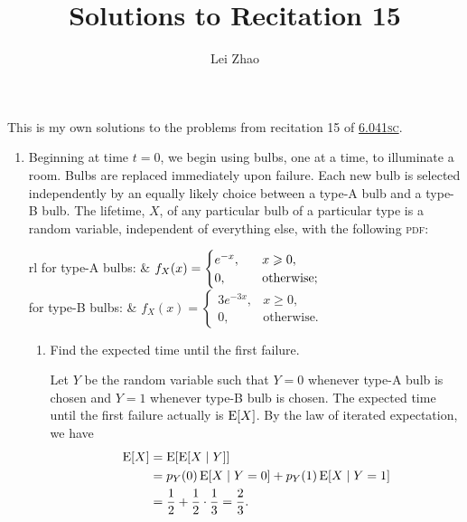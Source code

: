

\title{Solutions to Recitation 15}
\author{Lei Zhao}



\maketitle

This is my own solutions to the problems from recitation 15 of
\href{https://ocw.mit.edu/courses/electrical-engineering-and-computer-science/6-041sc-probabilistic-systems-analysis-and-applied-probability-fall-2013/unit-iii/lecture-13/}{6.041\textsc{sc}}.

\begin{enumerate}
\item Beginning at time \(t = 0\), we begin using bulbs, one at a
  time, to illuminate a room.  Bulbs are replaced immediately upon
  failure.  Each new bulb is selected independently by an equally
  likely choice between a type-A bulb and a type-B bulb.  The
  lifetime, \(X\), of any particular bulb of a particular type is a
  random variable, independent of everything else, with the following
  \textsc{pdf}:
  \begin{center}
    \begin{tabular}{rl}
      for type-A bulbs:
      & \(f_X(x) =
        \begin{cases}
          \mathrlap{e^{-x},} \hphantom{3e^{-3x},} & x \geq 0, \\
          0,     & \text{otherwise;}
        \end{cases}\) \\[1.5em]
      for type-B bulbs:
      & \(f_X(x) =
        \begin{cases}
          3e^{-3x}, & x \geq 0, \\
          0,       & \text{otherwise.}
        \end{cases}\)
    \end{tabular}
  \end{center}

  \begin{enumerate} \parasp
  \item Find the expected time until the first failure.

    Let \(Y\) be the random variable such that \(Y=0\) whenever type-A
    bulb is chosen and \(Y=1\) whenever type-B bulb is chosen.  The
    expected time until the first failure actually is \(\operatorname{E}[X]\).  By
    the law of iterated expectation, we have
    \begin{align*}
      \operatorname{E}[X] &= \operatorname{E}[\operatorname{E}[X \mid Y]] \\
            &= p_Y(0) \operatorname{E}[X \mid Y=0] + p_Y(1) \operatorname{E}[X \mid Y=1] \\
            &= \frac12 + \frac12 \cdot \frac13 = \frac23.
    \end{align*}


\end{enumerate}
\end{enumerate}

